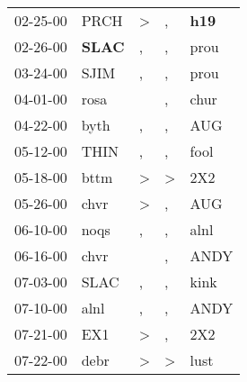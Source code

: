 \begin{supertabular}{p{0.07\textwidth}p{0.06\textwidth}p{0.02\textwidth}p{0.02\textwidth}p{0.06\textwidth}}
          02-25-00\textsuperscript{} &           PRCH\textsuperscript{} &     \textgreater &                , &   \textbf{h19\textsuperscript{}} \\
          02-26-00\textsuperscript{} &  \textbf{SLAC\textsuperscript{}} &                , &                , &           prou\textsuperscript{} \\
          03-24-00\textsuperscript{} &           SJIM\textsuperscript{} &                , &                , &           prou\textsuperscript{} \\
          04-01-00\textsuperscript{} &           rosa\textsuperscript{} &                  &                , &           chur\textsuperscript{} \\
          04-22-00\textsuperscript{} &           byth\textsuperscript{} &                , &                , &            AUG\textsuperscript{} \\
          05-12-00\textsuperscript{} &           THIN\textsuperscript{} &                , &                , &           fool\textsuperscript{} \\
          05-18-00\textsuperscript{} &           bttm\textsuperscript{} &     \textgreater &     \textgreater &            2X2\textsuperscript{} \\
          05-26-00\textsuperscript{} &           chvr\textsuperscript{} &     \textgreater &                , &            AUG\textsuperscript{} \\
          06-10-00\textsuperscript{} &           noqs\textsuperscript{} &                , &                , &           alnl\textsuperscript{} \\
          06-16-00\textsuperscript{} &           chvr\textsuperscript{} &                  &                , &           ANDY\textsuperscript{} \\
          07-03-00\textsuperscript{} &           SLAC\textsuperscript{} &                , &                , &           kink\textsuperscript{} \\
          07-10-00\textsuperscript{} &           alnl\textsuperscript{} &                , &                , &           ANDY\textsuperscript{} \\
          07-21-00\textsuperscript{} &            EX1\textsuperscript{} &     \textgreater &                , &            2X2\textsuperscript{} \\
          07-22-00\textsuperscript{} &           debr\textsuperscript{} &     \textgreater &     \textgreater &           lust\textsuperscript{} \\

\end{supertabular}
